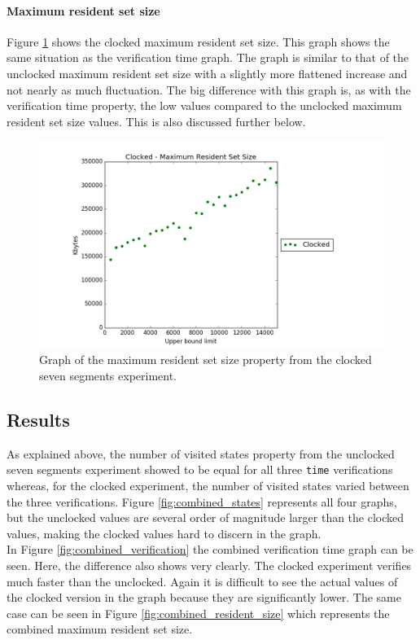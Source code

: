\paragraph{Maximum resident set size}
Figure \ref{fig:clocked_resident_size} shows the clocked maximum resident set size. This graph shows the same situation as the verification time graph. The graph is similar to that of the unclocked maximum resident set size with a slightly more flattened increase and not nearly as much fluctuation. The big difference with this graph is, as with the verification time property, the low values compared to the unclocked maximum resident set size values. This is also discussed further below.
\begin{figure}
    \centering
    \includegraphics[scale=0.6]{./figures/plots/clocked_size.png}
\caption{Graph of the maximum resident set size property from the clocked seven segments experiment.}
\label{fig:clocked_resident_size}
\end{figure}
\subsection{Results}
As explained above, the number of visited states property from the unclocked seven segments experiment showed to be equal for all three \texttt{time} verifications whereas, for the clocked experiment, the number of visited states varied between the three verifications. Figure \ref{fig:combined_states} represents all four graphs, but the unclocked values are several order of magnitude larger than the clocked values, making the clocked values hard to discern in the graph.\\

In Figure \ref{fig:combined_verification} the combined verification time graph can be seen. Here, the difference also shows very clearly. The clocked experiment verifies much faster than the unclocked. Again it is difficult to see the actual values of the clocked version in the graph because they are significantly lower. The same case can be seen in Figure \ref{fig:combined_resident_size} which represents the combined maximum resident set size. \\

